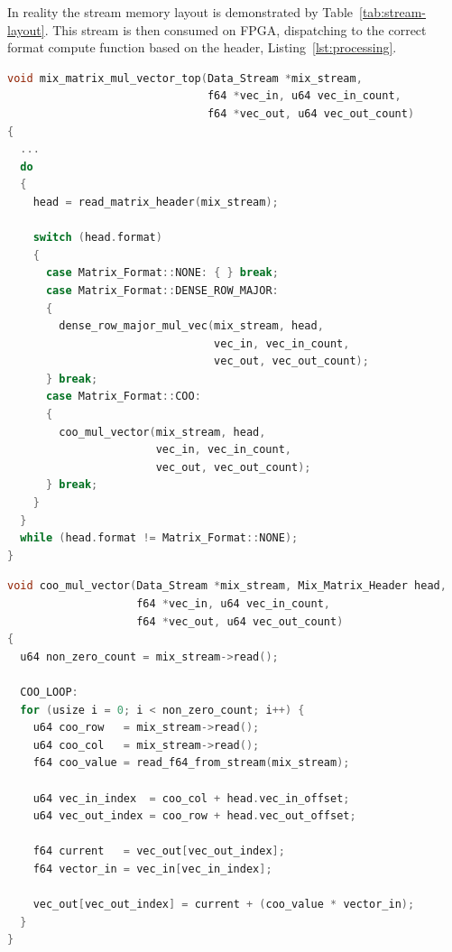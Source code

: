 In reality the stream memory layout is demonstrated by Table~\ref{tab:stream-layout}. This stream is then consumed on FPGA, dispatching to the correct format compute function based on the header, Listing~\ref{lst:processing}.

\begin{lstlisting}[float, language=C, caption={HLS Stream Processing on FPGA}, label={lst:processing}]
void mix_matrix_mul_vector_top(Data_Stream *mix_stream,
                               f64 *vec_in, u64 vec_in_count,
                               f64 *vec_out, u64 vec_out_count)
{
  ...
  do
  {
    head = read_matrix_header(mix_stream);

    switch (head.format)
    {
      case Matrix_Format::NONE: { } break;
      case Matrix_Format::DENSE_ROW_MAJOR:
      {
        dense_row_major_mul_vec(mix_stream, head,
                                vec_in, vec_in_count,
                                vec_out, vec_out_count);
      } break;
      case Matrix_Format::COO:
      {
        coo_mul_vector(mix_stream, head,
                       vec_in, vec_in_count,
                       vec_out, vec_out_count);
      } break;
    }
  }
  while (head.format != Matrix_Format::NONE);
}
\end{lstlisting}

\begin{lstlisting}[float, language=C, caption={HLS Stream COO Block Compute}, label={lst:coo_compute}]
void coo_mul_vector(Data_Stream *mix_stream, Mix_Matrix_Header head,
                    f64 *vec_in, u64 vec_in_count,
                    f64 *vec_out, u64 vec_out_count)
{
  u64 non_zero_count = mix_stream->read();

  COO_LOOP:
  for (usize i = 0; i < non_zero_count; i++) {
    u64 coo_row   = mix_stream->read();
    u64 coo_col   = mix_stream->read();
    f64 coo_value = read_f64_from_stream(mix_stream);

    u64 vec_in_index  = coo_col + head.vec_in_offset;
    u64 vec_out_index = coo_row + head.vec_out_offset;

    f64 current   = vec_out[vec_out_index];
    f64 vector_in = vec_in[vec_in_index];

    vec_out[vec_out_index] = current + (coo_value * vector_in);
  }
}
\end{lstlisting}

